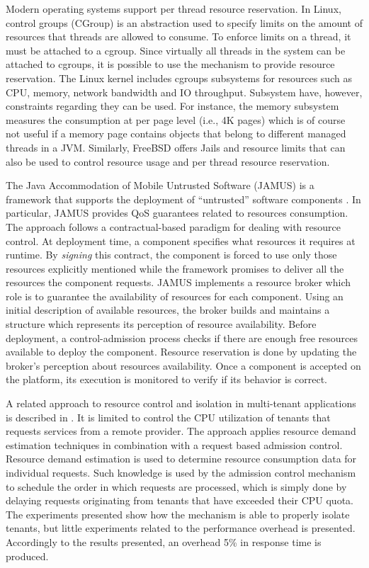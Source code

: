 Modern operating systems support per thread resource reservation.
In Linux, control groups (CGroup) \cite{Soltesz:2007:COS:1272998.1273025} is an abstraction used to specify limits on the amount of resources that threads are allowed to consume.
To enforce limits on a thread, it must be attached to a cgroup.
Since virtually all threads in the system can be attached to cgroups, it is possible to use the mechanism
to provide resource reservation.
The Linux kernel includes cgroups subsystems for resources such as CPU, memory, network bandwidth and IO throughput.
Subsystem have, however, constraints regarding they can be used.
For instance, the memory subsystem measures the consumption at per page level (i.e., 4K pages) which is of course not useful if a memory page contains objects that belong to different managed threads in a JVM. 
Similarly, FreeBSD offers Jails \cite{Kamp00jails:confining} and resource limits that can also be used to control resource usage and per thread resource reservation.

The Java Accommodation of Mobile Untrusted Software (JAMUS) is a framework that supports the deployment of ``untrusted'' software components \cite{JAMUS2002}.
In particular, JAMUS provides QoS guarantees related to resources consumption. 
The approach follows a contractual-based paradigm for dealing with resource control.
At deployment time, a component specifies what resources it requires at runtime.
By \textit{signing} this contract, the component is forced to use only those resources explicitly mentioned while the framework promises to deliver all the resources the component requests.
JAMUS implements a resource broker which role is to guarantee the availability of resources for each component.
Using an initial description of available resources, the broker builds and maintains a structure which represents its perception of resource availability.
Before deployment, a control-admission process checks if there are enough free resources available to deploy the component.
Resource reservation is done by updating the broker's perception about resources availability.
Once a component is accepted on the platform, its execution is monitored to verify if its behavior is correct.

A related approach to resource control and isolation in multi-tenant applications is described in \cite{KrSpAhKo2014_CCGrid_ResourceIsolation}.
It is limited to control the CPU utilization of tenants that requests services from a remote provider.
The approach applies resource demand estimation techniques in combination with a request based admission control.
Resource demand estimation is used to determine resource consumption data for individual requests.
Such knowledge is used by the admission control mechanism to schedule the order in which requests are processed, which is simply done by delaying requests originating from tenants that have exceeded their CPU quota.
The experiments presented show how the mechanism is able to properly isolate tenants, but little experiments related to the performance overhead is presented.
Accordingly to the results presented, an overhead 5\% in response time is produced.

